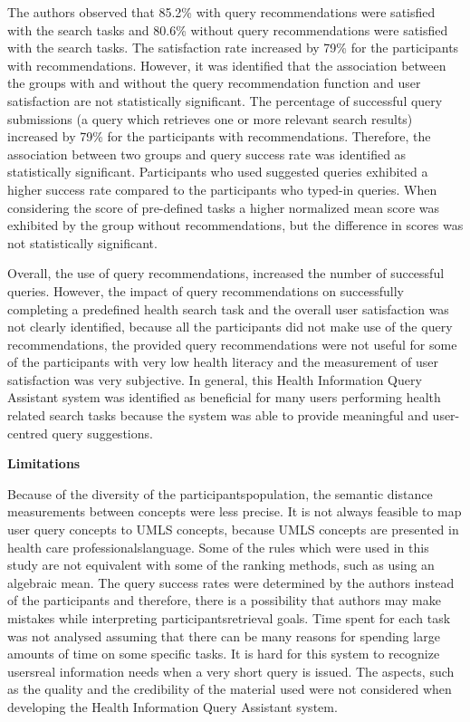 \documentclass[]{article}
\begin{document}
\begin{enumerate}
The authors observed that 85.2\% with query recommendations were satisfied with the search tasks and 80.6\% without query recommendations were satisfied with the search tasks. The satisfaction rate increased by 79\% for the participants with recommendations. However, it was identified that the association between the groups with and without the query recommendation function and user satisfaction are not statistically significant. The percentage of successful query submissions (a query which retrieves one or more relevant search results) increased by 79\% for the participants with recommendations. Therefore, the association between two groups and query success rate was identified as statistically significant. Participants who used suggested queries exhibited a higher success rate compared to the participants who typed-in queries. When considering the score of pre-defined tasks a higher normalized mean score was exhibited by the group without recommendations, but the difference in scores was not statistically significant.                     

Overall, the use of query recommendations, increased the number of successful queries. However, the impact of query recommendations on successfully completing a predefined health search task and the overall user satisfaction was not clearly identified, because all the participants did not make use of the query recommendations, the provided query recommendations were not useful for some of the participants with very low health literacy and the measurement of user satisfaction was very subjective. In general, this Health Information Query Assistant system was identified as beneficial for many users performing health related search tasks because the system was able to provide meaningful and user-centred query suggestions.

\textbf{Limitations}

Because of the diversity of the participants\textquotesingle population, the semantic distance measurements between concepts were less precise. It is not always feasible to map user query concepts to UMLS concepts, because UMLS concepts are presented in health care professionals\textquotesingle language. Some of the rules which were used in this study are not equivalent with some of the ranking methods, such as using an algebraic mean. The query success rates were determined by the authors instead of the participants and therefore, there is a possibility that authors may make mistakes while interpreting participants\textquotesingle retrieval goals. Time spent for each task was not analysed assuming that there can be many reasons for spending large amounts of time on some specific tasks. It is hard for this system to recognize users\textquotesingle  real information needs when a very short query is issued. The aspects, such as the quality and the credibility of the material used were not considered when developing the Health Information Query Assistant system. \\


\end{enumerate}
\end{document}
